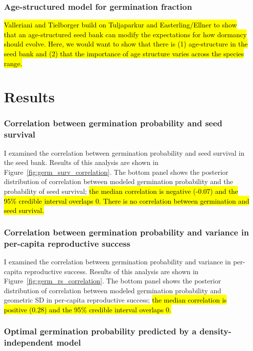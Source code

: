 \documentclass[12pt, oneside, titlepage]{article}   	%
\begin{document}
\subsubsection*{Age-structured model for germination fraction}

\hl{Valleriani and Tielborger build on Tuljaparkur and Easterling/Ellner to show that an age-structured seed bank can modify the expectations for how dormancy should evolve. Here, we would want to show that there is (1) age-structure in the seed bank and (2) that the importance of age structure varies across the species range.}

\section*{Results}

\subsubsection*{Correlation between germination probability and seed survival}

I examined the correlation between germination probability and seed survival in the seed bank. Results of this analysis are shown in Figure~\ref{fig:germ_surv_correlation}. The bottom panel shows the posterior distribution of correlation between modeled germination probability and the probability of seed survival; \hl{the median correlation is negative (-0.07) and the 95\% credible interval overlaps 0. There is no correlation between germination and seed survival.}

\subsubsection*{Correlation between germination probability and variance in per-capita reproductive success}

I examined the correlation between germination probability and variance in per-capita reproductive success. Results of this analysis are shown in Figure~\ref{fig:germ_rs_correlation}. The bottom panel shows the posterior distribution of correlation between modeled germination probability and geometric SD in per-capita reproductive success; \hl{the median correlation is positive (0.28) and the 95\% credible interval overlaps 0.}

\subsubsection*{Optimal germination probability predicted by a density-independent model}
\end{document}
